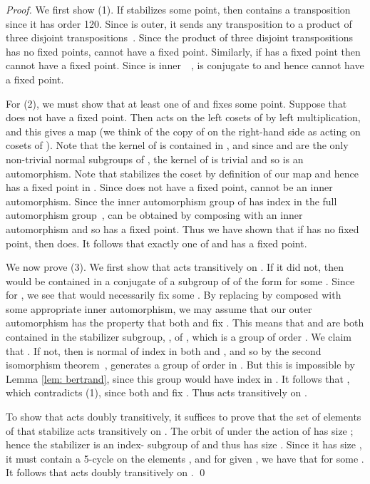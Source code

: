 \documentclass{llncs}
\begin{document}
\begin{proof}
We first show (1).  If  stabilizes some point, then  contains a transposition since it has order 120.  
Since  is outer, it sends any transposition to a product of three disjoint transpositions~\cite{MR0096724}. 
Since the product of three disjoint transpositions has no fixed points,   cannot have a fixed point.  
Similarly,  if  has a fixed point then  cannot have a fixed point.  
Since  is inner~~\cite[p. 133]{Rot65},  is conjugate to  and hence  cannot have a fixed point.  

For (2), we must show that at least one of  and  fixes some point.  
Suppose that  does not have a fixed point.  
Then  acts on the left cosets of  by left multiplication, and this gives a map  (we think of the copy of  on the right-hand side as acting on cosets of ).  
Note that the kernel of  is contained in , and since  and  are the only non-trivial normal subgroups of , 
 the kernel of  is trivial and so  is an automorphism.  
 Note that  stabilizes the coset  by definition of our map and hence  has a fixed point in .  
 Since  does not have a fixed point, 
  cannot be an inner automorphism.  
 Since the inner automorphism group of  has index  in the full automorphism group~\cite[p. 133]{Rot65}, 
   can be obtained by composing  with an inner automorphism and so  has a fixed point.  Thus we have shown that if  has no fixed point,  then   does. 
 It follows that exactly one of  and  has a fixed point.

 
We now prove (3).  We first show that  acts transitively on .  If it did not, then  would be contained in a conjugate of a subgroup of  of the form  for some .  Since  for , we see that  would necessarily fix some .  By replacing  by  composed with some appropriate inner automorphism, we may assume that our outer automorphism  has the property that both  and  fix .  This means that  and  are both contained in the stabilizer subgroup, , of , which is a group of order .  We claim that .  If not, then  is normal of index  in both  and , and so by the second isomorphism theorem~\cite[p. 26]{Rot65},  generates a group of order  in .  But this is impossible by Lemma \ref{lem: bertrand}, since this group would have index  in .  It follows that , which contradicts (1), since both  and  fix .  Thus  acts transitively on .  

To show that  acts doubly transitively, it suffices to prove that the set of elements of  that stabilize  acts transitively on .   The orbit of  under the action of  has size ; hence the stabilizer is an index- subgroup of  and thus has size .   
Since it has size , it must contain a 5-cycle  on the elements , and for given , we have that  for some .  
It follows that  acts doubly transitively on .  
\qed
\end{proof}
\end{document}
